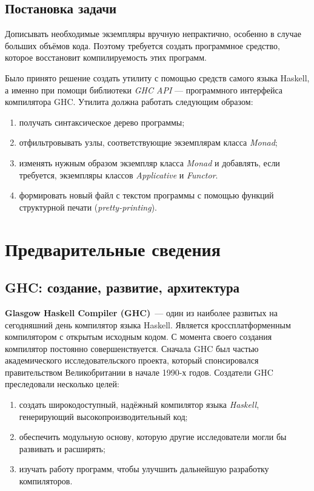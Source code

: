 \subsection*{Постановка задачи}
Дописывать необходимые экземпляры вручную непрактично, особенно в случае больших объёмов кода. Поэтому требуется создать программное средство, которое восстановит компилируемость этих программ.

Было принято решение создать утилиту с помощью средств самого языка Haskell, а именно при помощи библиотеки \textit{GHC API} --- программного интерфейса компилятора GHC. Утилита должна работать следующим образом:
\begin{enumerate}[1)]
\item получать синтаксическое дерево программы;
\item отфильтровывать узлы, соответствующие экземплярам класса \textit{Monad};
\item изменять нужным образом экземпляр класса \textit{Monad} и добавлять, если требуется, экземпляры классов \textit{Applicative} и \textit{Functor}.
\item формировать новый файл с текстом программы с помощью функций структурной печати (\textit{pretty-printing}).
\end{enumerate}


\newpage
\section{Предварительные сведения}
\label{sec:prelim}

\subsection{GHC: создание, развитие, архитектура}
\textbf{Glasgow Haskell Compiler (GHC)}~--- один из наиболее развитых на сегодняшний день компилятор языка Haskell. Является кроссплатформенным компилятором с открытым исходным кодом. С момента своего создания компилятор постоянно совершенствуется. Сначала GHC был частью академического исследовательского проекта, который спонсировался правительством Великобритании в начале 1990-х годов. Создатели GHC преследовали несколько целей:
\begin{enumerate}[1)]
\item создать широкодоступный, надёжный компилятор языка \textit{Haskell}, генерирующий высокопроизводительный код;
\item обеспечить модульную основу, которую другие исследователи могли бы развивать и расширять;
\item изучать работу программ, чтобы улучшить дальнейшую разработку компиляторов.
\end{enumerate}

